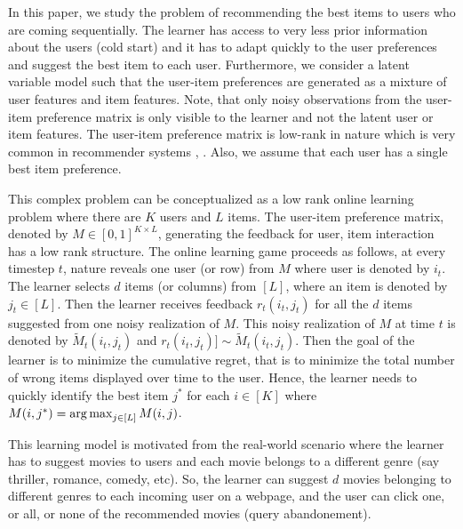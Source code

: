 In this paper, we study the problem of recommending the best items to users who are coming sequentially. The learner has access to very less prior information about the users (cold start) and it has to adapt quickly to the user preferences and suggest the best item to each user. Furthermore, we consider a latent variable model such that the user-item preferences are generated as a mixture of user features and item features. Note, that only noisy observations from the user-item preference matrix is only visible to the learner and not the latent user or item features. The user-item preference matrix is low-rank in nature which is very common in recommender systems \citep{koren2009matrix}, \citep{ricci2011liorrokach}. Also, we assume that each user has a single best item preference.

	This complex problem can be conceptualized as a low rank online learning  problem where there are $K$ users and $L$ items. The user-item preference  matrix, denoted by $M\in [0,1]^{K\times L}$,  generating the feedback for user, item interaction has a low rank structure. The online learning game proceeds as follows, at every timestep $t$,  nature reveals one user (or row) from $M$ where user is denoted by $i_t$. The learner selects $d$ items (or columns) from $[L]$, where an item is denoted by $j_t\in [L]$. Then the learner receives feedback $r_{t}(i_t,j_t)$ for all the $d$ items suggested from one noisy realization of $M$. This noisy realization of $M$ at time $t$ is denoted by $\tilde{M}_t(i_t,j_t)$ and  $r_{t}(i_t,j_t)] \sim \tilde{M}_t(i_t,j_t)$. Then the goal of the learner is to minimize the cumulative regret, that is to minimize the total number of wrong items displayed over time to the user. Hence, the learner needs to quickly identify the best item $j^*$ for each $i\in [K]$ where $M(i,j^*) = \mathop{\rm arg\,max} _{j\in[L]} M(i,j)$. 
	
	This learning model is motivated from the real-world scenario where the learner has  to suggest movies to users and each movie belongs to a different genre (say thriller, romance, comedy, etc). So, the learner can suggest $d$ movies belonging to different genres to each incoming user on a webpage, and the user can click one, or all, or none of the recommended movies (query abandonement).	
	

